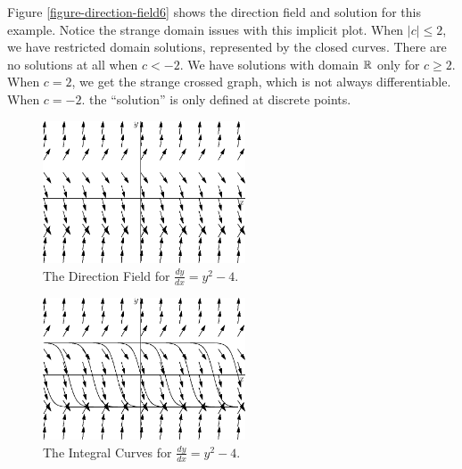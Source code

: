 \documentclass[fleqn,letterpaper]{report}
\begin{document}
Figure \ref{figure-direction-field6} shows the direction
field and solution for this example.  Notice the strange
domain issues with this implicit plot. When $|c| \leq 2$, we
have restricted domain solutions, represented by the closed
curves. There are no solutions at all when $c < -2$. We have
solutions with domain $\mathbb{R}$ only for $c \geq 2$. When $c = 2$,
we get the strange crossed graph, which is not always
differentiable. When $c=-2$. the ``solution'' is only defined
at discrete points.

\begin{figure}[t]
\centering
\includegraphics[width=6cm]{figure18.eps}
\caption{The Direction Field for $\frac{dy}{dx} = y^2-4$.}
\label{figure-direction-field7}
\end{figure}

\begin{figure}[t]
\centering
\includegraphics[width=6cm]{figure19.eps}
\caption{The Integral Curves for $\frac{dy}{dx} = y^2-4$.}
\label{figure-direction-field7-curves}
\end{figure}
\end{document}

